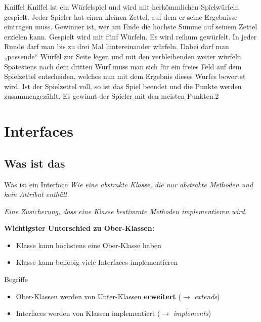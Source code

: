 \documentclass[18pt]{beamer}
\begin{document}

\begin{frame}{Kniffel}
Kniffel ist ein Würfelspiel und wird mit herkömmlichen Spielwürfeln gespielt. Jeder Spieler
hat einen kleinen Zettel, auf dem er seine Ergebnisse eintragen muss. Gewinner ist, wer am Ende die
höchste Summe auf seinem Zettel erzielen kann.
Gespielt wird mit fünf Würfeln. Es wird reihum gewürfelt. In jeder Runde darf man bis zu drei Mal
hintereinander würfeln. Dabei darf man „passende“ Würfel zur Seite legen und mit den verbleibenden
weiter würfeln. Spätestens nach dem dritten Wurf muss man sich für ein freies Feld auf dem Spielzettel
entscheiden, welches nun mit dem Ergebnis dieses Wurfes bewertet wird.
Ist der Spielzettel voll, so ist das Spiel beendet und die Punkte werden zusammengezählt. Es
gewinnt der Spieler mit den meisten Punkten.2
\end{frame}


\section{Interfaces}
\subsection*{Was ist das}
\begin{frame}{Was ist ein Interface}
	\emph{Wie eine abstrakte Klasse, die nur abstrakte Methoden und kein Attribut enthält.}\pause

	\emph{Eine Zusicherung, dass eine Klasse bestimmte Methoden implementieren wird.}\pause

	\textbf{Wichtigster Unterschied zu Ober-Klassen:}
	\begin{itemize}
		\item Klasse kann höchstens eine Ober-Klasse haben
		\item Klasse kann beliebig viele Interfaces implementieren
	\end{itemize}
\end{frame}


\begin{frame}{Begriffe}
	\begin{itemize}
		\item Ober-Klassen werden von Unter-Klassen \textbf{erweitert} ($\rightarrow$ \emph{extends})
		\item Interfaces werden von Klassen implementiert ($\rightarrow$ \emph{implements})
	\end{itemize}
\end{frame}
\end{document}
